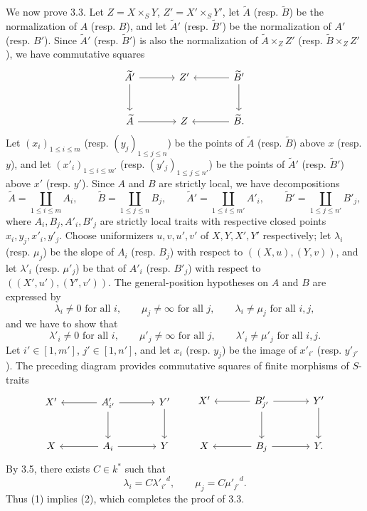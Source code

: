 \documentclass[11pt]{article}
\begin{document}
We now prove 3.3. Let $Z=X\times_SY$, $Z'=X'\times_SY'$, let $\widetilde A$ (resp. $\widetilde B$) be the normalization of $A$ (resp. $B$), and let $\widetilde A'$ (resp. $\widetilde B'$) be the normalization of $A'$ (resp. $B'$). Since $\widetilde A'$ (resp. $\widetilde B'$) is also the normalization of $\widetilde A\times_ZZ'$ (resp. $\widetilde B\times_ZZ'$), we have commutative squares
\[
\begin{tikzcd}[column sep=large,row sep=large]
\widetilde A' \arrow[r] \arrow[d] & Z' & \widetilde B' \arrow[l] \arrow[d]\\
\widetilde A \arrow[r] & Z & \widetilde B . \arrow[l]
\end{tikzcd}
\]
Let $(x_i)_{1\le i\le m}$ (resp. $(y_j)_{1\le j\le n}$) be the points of $\widetilde A$ (resp. $\widetilde B$) above $x$ (resp. $y$), and let $(x'_i)_{1\le i\le m'}$ (resp. $(y'_j)_{1\le j\le n'}$) be the points of $\widetilde A'$ (resp. $\widetilde B'$) above $x'$ (resp. $y'$). Since $A$ and $B$ are strictly local, we have decompositions
\[
\widetilde A=\coprod_{1\le i\le m}A_i,\qquad
\widetilde B=\coprod_{1\le j\le n}B_j,\qquad
\widetilde A'=\coprod_{1\le i\le m'}A'_i,\qquad
\widetilde B'=\coprod_{1\le j\le n'}B'_j,
\]
where $A_i,B_j,A'_i,B'_j$ are strictly local traits with respective closed points $x_i,y_j,x'_i,y'_j$. Choose uniformizers $u,v,u',v'$ of $X,Y,X',Y'$ respectively; let $\lambda_i$ (resp. $\mu_j$) be the slope of $A_i$ (resp. $B_j$) with respect to $((X,u),(Y,v))$, and let $\lambda'_i$ (resp. $\mu'_j$) be that of $A'_i$ (resp. $B'_j$) with respect to $((X',u'),(Y',v'))$. The general-position hypotheses on $A$ and $B$ are expressed by
\[
\lambda_i\ne0\text{ for all }i,\qquad
\mu_j\ne\infty\text{ for all }j,\qquad
\lambda_i\ne\mu_j\text{ for all }i,j,
\tag{1}
\]
and we have to show that
\[
\lambda'_i\ne0\text{ for all }i,\qquad
\mu'_j\ne\infty\text{ for all }j,\qquad
\lambda'_i\ne\mu'_j\text{ for all }i,j.
\tag{2}
\]
Let $i'\in[1,m']$, $j'\in[1,n']$, and let $x_i$ (resp. $y_j$) be the image of $x'_{i'}$ (resp. $y'_{j'}$). The preceding diagram provides commutative squares of finite morphisms of $S$-traits
\[
\begin{tikzcd}[column sep=large,row sep=large]
X' & A'_{i'} \arrow[l] \arrow[r] \arrow[d] & Y' \arrow[d]\\
X & A_i \arrow[l] \arrow[r] & Y
\end{tikzcd}
\qquad
\begin{tikzcd}[column sep=large,row sep=large]
X' & B'_{j'} \arrow[l] \arrow[r] \arrow[d] & Y' \arrow[d]\\
X & B_j \arrow[l] \arrow[r] & Y .
\end{tikzcd}
\]
By 3.5, there exists $C\in k^*$ such that
\[
\lambda_i=C{\lambda'_{i'}}^d,\qquad
\mu_j=C{\mu'_{j'}}^d.
\]
Thus (1) implies (2), which completes the proof of 3.3.
\end{document}
